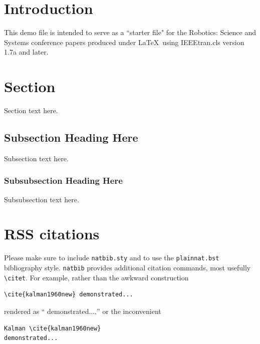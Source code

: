 \documentclass[conference]{IEEEtran}
\begin{document}
\begin{abstract}
The abstract goes here.
\end{abstract}

\IEEEpeerreviewmaketitle

\section{Introduction}
This demo file is intended to serve as a ``starter file" for the
Robotics: Science and Systems conference papers produced under \LaTeX\
using IEEEtran.cls version 1.7a and later.  

\the\textwidth

\the\columnwidth

\section{Section}

Section text here. 

\subsection{Subsection Heading Here}
Subsection text here.

\subsubsection{Subsubsection Heading Here}
Subsubsection text here.


\section{RSS citations}

Please make sure to include \verb!natbib.sty! and to use the
\verb!plainnat.bst! bibliography style. \verb!natbib! provides additional
citation commands, most usefully \verb!\citet!. For example, rather than the
awkward construction 

{\small
\begin{verbatim}
\cite{kalman1960new} demonstrated...
\end{verbatim}
}

\noindent
rendered as ``\cite{kalman1960new} demonstrated...,''
or the
inconvenient 

{\small
\begin{verbatim}
Kalman \cite{kalman1960new} 
demonstrated...
\end{verbatim}
}
\end{document}
